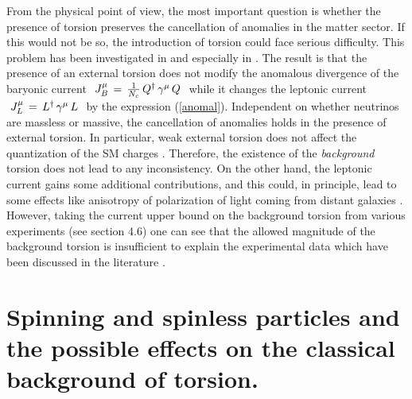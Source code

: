 From the physical point of view, the most important 
question is whether the presence of torsion preserves the
cancellation of anomalies in the matter sector. If this 
would not be so, the introduction of torsion could face 
serious difficulty. This problem 
has been investigated in \cite{coggia} and especially in 
\cite{doma1}. The result is that the presence of an
external torsion does not modify the anomalous divergence of 
the baryonic current
$\,\,J^\mu_B\,=\,\frac{1}{N_c}\,Q^\dagger\,\gamma^\mu\,Q\,\,$
while it changes the leptonic current 
$\,\,J^\mu_L\,=\,L^\dagger\,\gamma^\mu\,L\,\,$ by the expression
(\ref{anomal}). Independent on whether neutrinos are massless or 
massive, the cancellation of anomalies holds in the presence
of external torsion. In particular, weak external torsion does 
not affect the quantization of the SM charges \cite{doma1}. 
Therefore, the existence of the {\sl background} 
torsion does not lead to any inconsistency. On the other hand, the 
leptonic current gains some additional contributions, and this could,
in principle, lead to some effects like anisotropy of 
polarization of light coming from distant galaxies \cite{doma}.
However, taking the current upper bound on the background torsion 
from various experiments (see section 4.6)
one can see that the allowed magnitude of the background torsion 
is insufficient to explain the experimental
data which have been discussed in the literature \cite{nodrol}. 


\chapter{Spinning and spinless particles and the 
possible effects on the classical background of torsion.}

